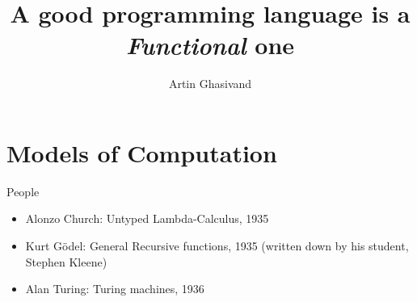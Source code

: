 \documentclass[pdf]{beamer}
\title{A good programming language is a \textit{Functional} one}
\author{Artin Ghasivand}
\begin{document}
\begin{frame}
  \titlepage
\end{frame}

\section{Models of Computation}
\label{sec:models-of-computation}

\begin{frame}{People}
  \begin{figure}[ht!]
    \centering
    \hspace{0.1cm}
    \hspace{0.1cm}
  \end{figure}
  \begin{itemize}
  \item Alonzo Church: Untyped Lambda-Calculus, 1935
  \item Kurt Gödel: General Recursive functions, 1935 (written down by his student, Stephen Kleene)
  \item Alan Turing: Turing machines, 1936
  \end{itemize}
\end{frame}
\end{document}
